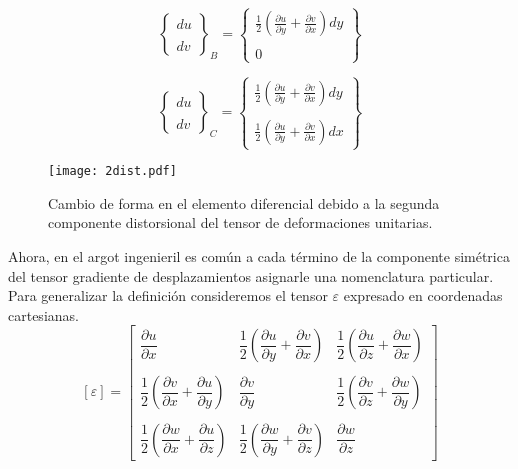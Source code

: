 \documentclass[../notas medios.tex]{subfiles}
\begin{document}
\[{\left\{ {\begin{array}{*{20}{c}}
{du}\\\\
{dv}
\end{array}} \right\}_B} = \left\{ {\begin{array}{*{20}{c}}
{\frac{1}{2}\left( {\frac{{\partial u}}{{\partial y}} + \frac{{\partial v}}{{\partial x}}} \right)dy}\\\\
0
\end{array}} \right\}\]

\[{\left\{ {\begin{array}{*{20}{c}}
{du}\\\\
{dv}
\end{array}} \right\}_C} = \left\{ {\begin{array}{*{20}{c}}
{\frac{1}{2}\left( {\frac{{\partial u}}{{\partial y}} + \frac{{\partial v}}{{\partial x}}} \right)dy}\\\\
{\frac{1}{2}\left( {\frac{{\partial u}}{{\partial y}} + \frac{{\partial v}}{{\partial x}}} \right)dx}
\end{array}} \right\}\]

\begin{figure}[H]
\centering
	\texttt{[image: 2dist.pdf]}
	\caption{Cambio de forma en el elemento diferencial debido a la segunda componente distorsional del tensor de deformaciones unitarias.}
	\label{2dist}
\end{figure}

Ahora, en el argot ingenieril es común a cada término de la componente simétrica del tensor gradiente de desplazamientos asignarle una nomenclatura particular. Para generalizar la definición consideremos el tensor $\varepsilon$ expresado en coordenadas cartesianas. 
\[	
[\varepsilon] =
\begin{bmatrix}
	\dfrac{\partial u}{\partial x} & \dfrac{1}{2} \left(\dfrac{\partial u}{\partial y} + \dfrac{\partial v}{\partial x}\right)  & \dfrac{1}{2} \left(\dfrac{\partial u}{\partial z} + \dfrac{\partial w}{\partial x}\right) \\\\
	\dfrac{1}{2} \left( \dfrac{\partial v}{\partial x} + \dfrac{\partial u}{\partial y} \right)  & \dfrac{\partial v}{\partial y} & \dfrac{1}{2} \left(\dfrac{\partial v}{\partial z}+\dfrac{\partial w}{\partial y}\right) \\\\
	 \dfrac{1}{2} \left(\dfrac{\partial w}{\partial x} + \dfrac{\partial u}{\partial z} \right) & \dfrac{1}{2} \left(\dfrac{\partial w}{\partial y} + \dfrac{\partial v}{\partial z}\right)  & \dfrac{\partial w}{\partial z}
\end{bmatrix}\]\\
\end{document}
